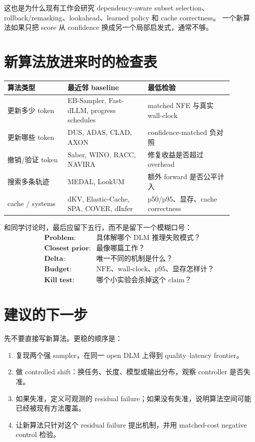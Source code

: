 \documentclass[11pt]{ctexart}
\begin{document}
这也是为什么现有工作会研究 dependency-aware subset selection、rollback/remasking、lookahead、learned policy 和 cache correctness。
一个新算法如果只把 score 从 confidence 换成另一个局部启发式，通常不够。

\section{新算法放进来时的检查表}

\begin{center}
\begin{tabular}{p{0.24\linewidth}p{0.32\linewidth}p{0.34\linewidth}}
\toprule
算法类型 & 最近邻 baseline & 最低检验 \\
\midrule
更新多少 token & EB-Sampler, Fast-dLLM, progress schedules & matched NFE 与真实 wall-clock \\
更新哪些 token & DUS, ADAS, CLAD, AXON & confidence-matched 负对照 \\
撤销/验证 token & Saber, WINO, RACC, NAVIRA & 修复收益是否超过 overhead \\
搜索多条轨迹 & MEDAL, LookUM & 额外 forward 是否公平计入 \\
cache / systems & dKV, Elastic-Cache, SPA, COVER, dInfer & p50/p95、显存、cache correctness \\
\bottomrule
\end{tabular}
\end{center}

和同学讨论时，最后应留下五行，而不是留下一个模糊口号：
\[
\begin{array}{ll}
\textbf{Problem:} & \text{具体解哪个 DLM 推理失败模式？}\\
\textbf{Closest prior:} & \text{最像哪篇工作？}\\
\textbf{Delta:} & \text{唯一不同的机制是什么？}\\
\textbf{Budget:} & \text{NFE、wall-clock、p95、显存怎样计？}\\
\textbf{Kill test:} & \text{哪个小实验会杀掉这个 claim？}
\end{array}
\]

\section{建议的下一步}

先不要直接写新算法。更稳的顺序是：
\begin{enumerate}[leftmargin=18pt]
  \item 复现两个强 sampler，在同一 open DLM 上得到 quality--latency frontier。
  \item 做 controlled shift：换任务、长度、模型或输出分布，观察 controller 是否失准。
  \item 如果失准，定义可观测的 residual failure；如果没有失准，说明算法空间可能已经被现有方法覆盖。
  \item 让新算法只针对这个 residual failure 提出机制，并用 matched-cost negative control 检验。
\end{enumerate}
\end{document}
